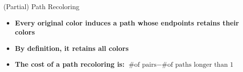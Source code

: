\begin{frame}{(Partial) Path Recoloring}

\begin{itemize}

\item \textbf<1>
{Every original color induces a path whose endpoints retains their colors} 

\item \textbf<2>
{By definition, it retains all colors} 

\item \textbf<3>
{The cost of a path recoloring is: 
$\text{\# of pairs} - \text{\# of paths longer than 1}$}

\end{itemize}




\end{frame}